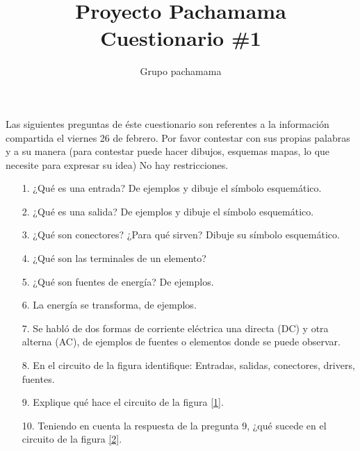 \documentclass{article}
\title{Proyecto Pachamama\\Cuestionario \#1}
\author{Grupo pachamama}
\begin{document}
\maketitle
Las siguientes preguntas de éste cuestionario son referentes a la información compartida el viernes 26 de febrero.
Por favor contestar con sus propias palabras y a su manera (para contestar puede hacer dibujos, esquemas mapas, lo que necesite para expresar su idea) No hay restricciones.

\begin{itemize}
		\item [1.] ¿Qué es una entrada? De ejemplos y dibuje el símbolo esquemático. 
		\item [2.] ¿Qué es una salida? De ejemplos y dibuje el símbolo esquemático.
		\item [3.] ¿Qué son conectores? ¿Para qué sirven? Dibuje su símbolo esquemático.
		\item [4.] ¿Qué son las terminales de un elemento?
		\item [5.] ¿Qué son fuentes de energía? De ejemplos.
		\item [6.] La energía se transforma, de ejemplos.
		\item [7.] Se habló de dos formas de corriente eléctrica una directa (DC) y otra alterna (AC), de ejemplos
				de fuentes o elementos donde se puede observar.
		\item [8.] En el circuito de la figura identifique: Entradas, salidas, conectores, drivers, fuentes.
		\item [9.] Explique qué hace el circuito de la figura \ref{1}.
		\item [10.] Teniendo en cuenta la respuesta de la pregunta 9, ¿qué sucede en el circuito de la figura \ref{2}.
\end{itemize}

%
\end{document}
